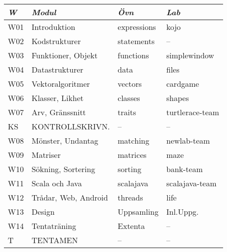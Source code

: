 \begin{tabular}{l|l|l|l}
\textit{W} & \textit{Modul} & \textit{Övn} & \textit{Lab} \\ \hline \hline
W01 & Introduktion         & expressions & kojo            \\
W02 & Kodstrukturer        & statements  & --              \\
W03 & Funktioner, Objekt   & functions   & simplewindow    \\
W04 & Datastrukturer       & data        & files           \\
W05 & Vektoralgoritmer     & vectors     & cardgame        \\
W06 & Klasser, Likhet      & classes     & shapes          \\
W07 & Arv, Gränssnitt      & traits      & turtlerace-team \\
KS  & KONTROLLSKRIVN.      & --          & --              \\
W08 & Mönster, Undantag    & matching    & newlab-team     \\
W09 & Matriser             & matrices    & maze            \\
W10 & Sökning, Sortering   & sorting     & bank-team       \\
W11 & Scala och Java       & scalajava   & scalajava-team  \\
W12 & Trådar, Web, Android & threads     & life            \\
W13 & Design               & Uppsamling  & Inl.Uppg.       \\
W14 & Tentaträning         & Extenta     & --              \\
T   & TENTAMEN             & --          & --              \\
\end{tabular}
